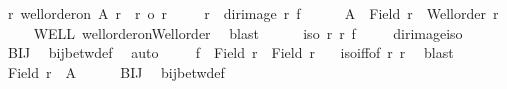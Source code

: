 \begin{isabellebody}
\ {\isachardoublequoteopen}{\isasymexists}r{\isacharprime}{\kern0pt}{\isachardot}{\kern0pt}\ well{\isacharunderscore}{\kern0pt}order{\isacharunderscore}{\kern0pt}on\ A{\isacharprime}{\kern0pt}\ r{\isacharprime}{\kern0pt}\ {\isasymand}\ r\ {\isacharequal}{\kern0pt}o\ r{\isacharprime}{\kern0pt}{\isachardoublequoteclose}\isanewline
%
\isadelimproof
%
\endisadelimproof
%
\isatagproof
{}\isamarkupfalse%
{\isacharminus}{\kern0pt}\isanewline
\ \ \ \isamarkupfalse%
\ {\isacharquery}{\kern0pt}r{\isacharprime}{\kern0pt}\ {\isacharequal}{\kern0pt}\ {\isachardoublequoteopen}dir{\isacharunderscore}{\kern0pt}image\ r\ f{\isachardoublequoteclose}\isanewline
\ \ \ \isamarkupfalse%
\ {}{\isacharcolon}{\kern0pt}\ {\isachardoublequoteopen}A\ {\isacharequal}{\kern0pt}\ Field\ r\ {\isasymand}\ Well{\isacharunderscore}{\kern0pt}order\ r{\isachardoublequoteclose}\isanewline
\ \ \ \isamarkupfalse%
\ WELL\ well{\isacharunderscore}{\kern0pt}order{\isacharunderscore}{\kern0pt}on{\isacharunderscore}{\kern0pt}Well{\isacharunderscore}{\kern0pt}order\ \isamarkupfalse%
\ blast\isanewline
\ \ \ \isamarkupfalse%
\ {}{\isacharcolon}{\kern0pt}\ {\isachardoublequoteopen}iso\ r\ {\isacharquery}{\kern0pt}r{\isacharprime}{\kern0pt}\ f{\isachardoublequoteclose}\isanewline
\ \ \ \isamarkupfalse%
\ dir{\isacharunderscore}{\kern0pt}image{\isacharunderscore}{\kern0pt}iso\ \isamarkupfalse%
\ BIJ\ \isamarkupfalse%
\ bij{\isacharunderscore}{\kern0pt}betw{\isacharunderscore}{\kern0pt}def\ \isamarkupfalse%
\ auto\isanewline
\ \ \ \isamarkupfalse%
\ {\isachardoublequoteopen}f\ {\isacharbackquote}{\kern0pt}\ {\isacharparenleft}{\kern0pt}Field\ r{\isacharparenright}{\kern0pt}\ {\isacharequal}{\kern0pt}\ Field\ {\isacharquery}{\kern0pt}r{\isacharprime}{\kern0pt}{\isachardoublequoteclose}\ \isamarkupfalse%
\ {}\ iso{\isacharunderscore}{\kern0pt}iff{\isacharbrackleft}{\kern0pt}of\ r\ {\isacharquery}{\kern0pt}r{\isacharprime}{\kern0pt}{\isacharbrackright}{\kern0pt}\ \isamarkupfalse%
\ blast\isanewline
\ \ \ \isamarkupfalse%
\ {\isachardoublequoteopen}Field\ {\isacharquery}{\kern0pt}r{\isacharprime}{\kern0pt}\ {\isacharequal}{\kern0pt}\ A{\isacharprime}{\kern0pt}{\isachardoublequoteclose}\isanewline
\ \ \ \isamarkupfalse%
\ {}\ BIJ\ \isamarkupfalse%
\ bij{\isacharunderscore}{\kern0pt}betw{\isacharunderscore}{\kern0pt}def\ \isamarkupfalse%

\end{isabellebody}
